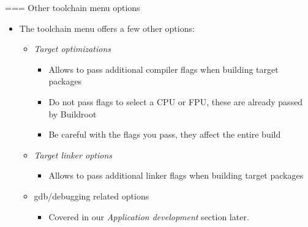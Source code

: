 === Other toolchain menu options
  \begin{itemize}
  \item The toolchain menu offers a few other options:
    \begin{itemize}
    \item {\em Target optimizations}
      \begin{itemize}
      \item Allows to pass additional compiler flags when building
        target packages
      \item Do not pass flags to select a CPU or FPU, these are
        already passed by Buildroot
      \item Be careful with the flags you pass, they affect the entire
        build
      \end{itemize}
    \item {\em Target linker options}
      \begin{itemize}
      \item Allows to pass additional linker flags when building
        target packages
      \end{itemize}
    \item gdb/debugging related options
      \begin{itemize}
      \item Covered in our {\em Application development} section later.
      \end{itemize}
    \end{itemize}
  \end{itemize}

